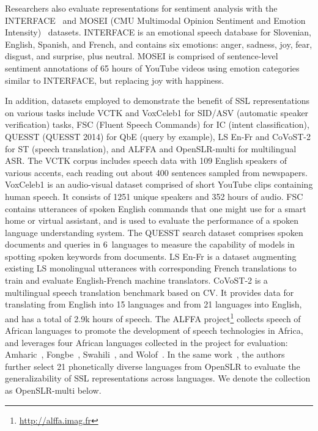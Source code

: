 Researchers also evaluate representations for sentiment analysis with the
INTERFACE~\parencite{hozjan_interface_2002} and MOSEI (CMU Multimodal Opinion
Sentiment and Emotion Intensity)~\parencite{zadeh_multimodal_2018} datasets. INTERFACE
is an emotional speech database for Slovenian, English, Spanish, and French,
and contains six emotions: anger, sadness, joy, fear, disgust, and
surprise, plus neutral. MOSEI is comprised of sentence-level sentiment
annotations of 65 hours of YouTube videos
using emotion categories similar to INTERFACE, but replacing joy with
happiness.

In addition, datasets employed to demonstrate the benefit of SSL
representations on various tasks include VCTK \parencite{veaux_cstr_2016} and VoxCeleb1 \parencite{nagrani_voxceleb_2017} for SID/ASV (automatic speaker verification) tasks, FSC (Fluent Speech Commands) \parencite{lugosch_speech_2019} for IC (intent classification), QUESST
(QUESST 2014) \parencite{anguera_quesst2014_2015} for QbE (query by example), LS En-Fr \parencite{kocabiyikoglu_augmenting_2018} and CoVoST-2 \parencite{wang_covost_2020} for ST (speech translation), and ALFFA and OpenSLR-multi for multilingual ASR. The VCTK corpus includes speech
data with 109 English speakers of various accents, each reading out about 400
sentences sampled from newspapers. VoxCeleb1 is an audio-visual dataset
comprised of short YouTube clips containing human speech. It consists of 1251
unique speakers and 352 hours of audio. FSC contains utterances of spoken
English commands that one might use for a smart home or virtual assistant, and
is used to evaluate the performance of a spoken language understanding system.
The QUESST search dataset comprises spoken documents and queries in 6~languages
to measure the capability of models in spotting spoken keywords from documents.
LS En-Fr is a dataset augmenting existing LS monolingual utterances with
corresponding French translations to train and evaluate English-French machine
translators. CoVoST-2 is a multilingual speech translation benchmark based on
CV. It provides data for translating from English into 15 languages and from 21
languages into English, and has a total of 2.9k hours of speech. The ALFFA
project\footnote{\url{http://alffa.imag.fr}} collects speech of African
languages to promote the development of speech technologies in Africa, and
\parencite{kawakami_learning_2020} leverages four African languages collected in the
project for evaluation: Amharic~\parencite{tachbelie_using_2014}, Fongbe~\parencite{laleye_first_2016},
Swahili~\parencite{gelas_developments_2012}, and Wolof~\parencite{gauthier_collecting_2016}.
In the same work~\parencite{kawakami_learning_2020}, the authors
further select 21 phonetically diverse languages from OpenSLR to evaluate the
generalizability of SSL representations across languages. We denote the
collection as OpenSLR-multi below.

